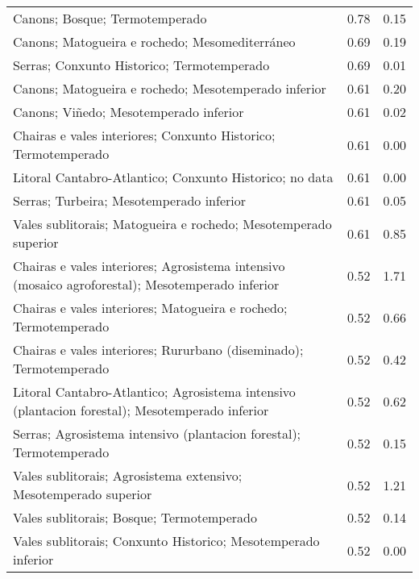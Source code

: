 \begin{table}[p]
\begin{tabular}{lrr}
  Canons; Bosque; Termotemperado & 0.78 & 0.15 \\ 
  Canons; Matogueira e rochedo; Mesomediterráneo & 0.69 & 0.19 \\ 
  Serras; Conxunto Historico; Termotemperado & 0.69 & 0.01 \\ 
  Canons; Matogueira e rochedo; Mesotemperado inferior & 0.61 & 0.20 \\ 
  Canons; Viñedo; Mesotemperado inferior & 0.61 & 0.02 \\ 
  Chairas e vales interiores; Conxunto Historico; Termotemperado & 0.61 & 0.00 \\ 
  Litoral Cantabro-Atlantico; Conxunto Historico; no data & 0.61 & 0.00 \\ 
  Serras; Turbeira; Mesotemperado inferior & 0.61 & 0.05 \\ 
  Vales sublitorais; Matogueira e rochedo; Mesotemperado superior & 0.61 & 0.85 \\ 
  Chairas e vales interiores; Agrosistema intensivo (mosaico agroforestal); Mesotemperado inferior & 0.52 & 1.71 \\ 
  Chairas e vales interiores; Matogueira e rochedo; Termotemperado & 0.52 & 0.66 \\ 
  Chairas e vales interiores; Rururbano (diseminado); Termotemperado & 0.52 & 0.42 \\ 
  Litoral Cantabro-Atlantico; Agrosistema intensivo (plantacion forestal); Mesotemperado inferior & 0.52 & 0.62 \\ 
  Serras; Agrosistema intensivo (plantacion forestal); Termotemperado & 0.52 & 0.15 \\ 
  Vales sublitorais; Agrosistema extensivo; Mesotemperado superior & 0.52 & 1.21 \\ 
  Vales sublitorais; Bosque; Termotemperado & 0.52 & 0.14 \\ 
  Vales sublitorais; Conxunto Historico; Mesotemperado inferior & 0.52 & 0.00 \\ 
   \hline
\end{tabular}
\end{table}
